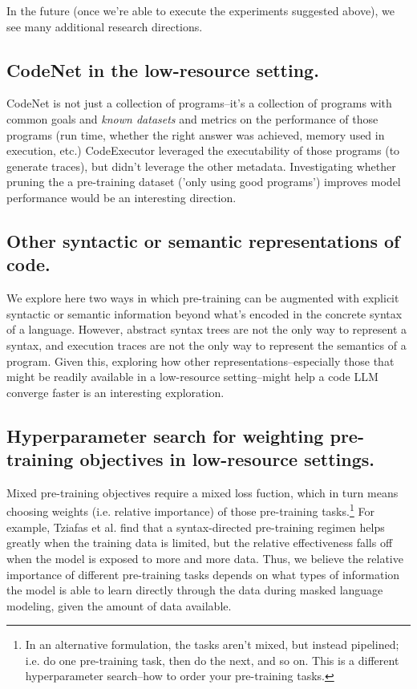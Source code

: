 \documentclass[acmlarge]{acmart}
\begin{document}
In the future (once we're able to execute the experiments suggested above), we see many additional research directions. 

\subsection{CodeNet in the low-resource setting.} 

CodeNet \cite{CodeNet} is not just a collection of programs--it's a collection of programs with common goals and \emph{known datasets} and metrics on the performance of those programs (run time, whether the right answer was achieved, memory used in execution, etc.) CodeExecutor \cite{CodeExecutor} leveraged the executability of those programs (to generate traces), but didn't leverage the other metadata. Investigating whether pruning the a pre-training dataset ('only using good programs') improves model performance would be an interesting direction.


\subsection{Other syntactic or semantic representations of code.} 
We explore here two ways in which pre-training can be augmented with explicit syntactic or semantic information beyond what's encoded in the concrete syntax of a language. However, abstract syntax trees are not the only way to represent a syntax, and execution traces are not the only way to represent the  semantics of a program. Given this, exploring how other representations--especially those that might be readily available in a low-resource setting--might help a code LLM converge faster is an interesting exploration.

\subsection{Hyperparameter search for weighting pre-training objectives in low-resource settings.} 
Mixed pre-training objectives require a mixed loss fuction, which in turn means choosing weights (i.e. relative importance) of those pre-training tasks.\footnote{In an alternative formulation, the tasks aren't mixed, but instead pipelined; i.e. do one pre-training task, then do the next, and so on. This is a different hyperparameter search--how to order your pre-training tasks.} For example, Tziafas et al. \cite{Tziafas} find that a syntax-directed pre-training regimen helps greatly when the training data is limited, but the relative effectiveness falls off when the model is exposed to more and more data. Thus, we believe the relative importance of different pre-training tasks depends on what types of information the model is able to learn directly through the data during masked language modeling, given the amount of data available.
\end{document}
